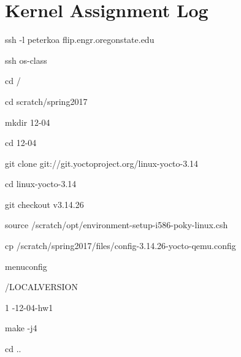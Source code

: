 \documentclass[draftclsnofoot,onecolumn,10pt]{article}
\begin{document}
    \section{Kernel Assignment Log}
    \begin{flushleft}
    ssh -l peterkoa flip.engr.oregonstate.edu\
    \end{flushleft}
    \begin{flushleft}
    ssh os-class\
    \end{flushleft}
    \begin{flushleft}
    cd /\
    \end{flushleft}
    \begin{flushleft}
    cd scratch/spring2017\
    \end{flushleft}
    \begin{flushleft}
    mkdir 12-04\
    \end{flushleft}
    \begin{flushleft}
    cd 12-04\
    \end{flushleft}
    \begin{flushleft}
    git clone git://git.yoctoproject.org/linux-yocto-3.14\
    \end{flushleft}
    \begin{flushleft}
    cd linux-yocto-3.14\
    \end{flushleft}
    \begin{flushleft}
    git checkout v3.14.26\
    \end{flushleft}
    \begin{flushleft}
    source /scratch/opt/environment-setup-i586-poky-linux.csh\
    \end{flushleft}
    \begin{flushleft}
    cp /scratch/spring2017/files/config-3.14.26-yocto-qemu.config\
    \end{flushleft}
    \begin{flushleft}
    menuconfig\
    \end{flushleft}
    \begin{flushleft}
    /LOCALVERSION\
    \end{flushleft}
    \begin{flushleft}
    1 -12-04-hw1\
    \end{flushleft}
    \begin{flushleft}
    make -j4\
    \end{flushleft}
    \begin{flushleft}
    cd ..\
    \end{flushleft}
\end{document}
